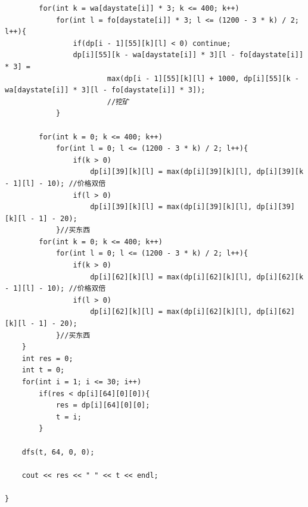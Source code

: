 \begin{verbatim}
        for(int k = wa[daystate[i]] * 3; k <= 400; k++)   
            for(int l = fo[daystate[i]] * 3; l <= (1200 - 3 * k) / 2; l++){
                if(dp[i - 1][55][k][l] < 0) continue;
                dp[i][55][k - wa[daystate[i]] * 3][l - fo[daystate[i]] * 3] = 
                        max(dp[i - 1][55][k][l] + 1000, dp[i][55][k - wa[daystate[i]] * 3][l - fo[daystate[i]] * 3]);
                        //挖矿
            }

        for(int k = 0; k <= 400; k++)   
            for(int l = 0; l <= (1200 - 3 * k) / 2; l++){
                if(k > 0)
                    dp[i][39][k][l] = max(dp[i][39][k][l], dp[i][39][k - 1][l] - 10); //价格双倍
                if(l > 0)
                    dp[i][39][k][l] = max(dp[i][39][k][l], dp[i][39][k][l - 1] - 20);
            }//买东西
        for(int k = 0; k <= 400; k++)   
            for(int l = 0; l <= (1200 - 3 * k) / 2; l++){
                if(k > 0)
                    dp[i][62][k][l] = max(dp[i][62][k][l], dp[i][62][k - 1][l] - 10); //价格双倍
                if(l > 0)
                    dp[i][62][k][l] = max(dp[i][62][k][l], dp[i][62][k][l - 1] - 20);
            }//买东西
    }
    int res = 0;
    int t = 0;
    for(int i = 1; i <= 30; i++)
        if(res < dp[i][64][0][0]){
            res = dp[i][64][0][0];
            t = i;
        }

    dfs(t, 64, 0, 0);

    cout << res << " " << t << endl;

}
\end{verbatim}

